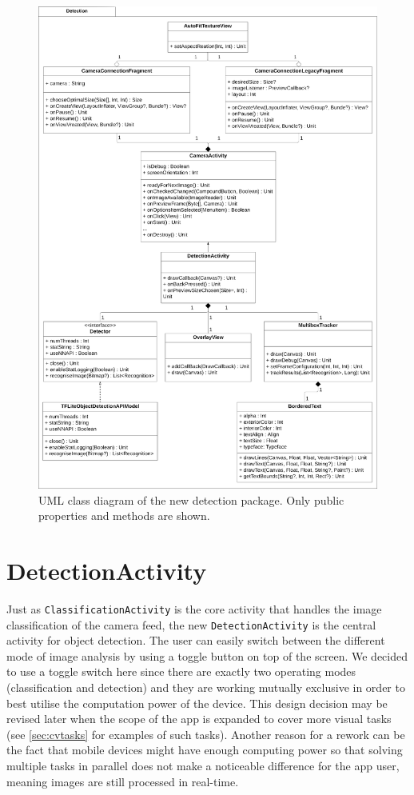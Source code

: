 \documentclass[
			   fontsize=11pt,
               paper=a4,
               bibliography=totoc,
               idxtotoc,
               headsepline,
               footsepline,
               footinclude=false,
               BCOR=12mm,
               DIV=13,
               openany,   %
               ]
               {scrbook}
\newcommand{\code}[1]{\lstinline[basicstyle = \ttfamily\small]{#1}} %
\begin{document}
\begin{figure}[H] %
	\centering
	\includegraphics[width=\textwidth]{figures/uml_detection_package.png}
	\caption[UML Class Diagram of The New Detection Package]{UML class diagram of the new detection package. Only public properties and methods are shown.}
	\label{fig:umlDetectionPackage} %
\end{figure}


\section{DetectionActivity}

Just as \code{ClassificationActivity} is the core activity that handles the image classification of the camera feed, the new \code{DetectionActivity} is the central activity for object detection. The user can easily switch between the different mode of image analysis by using a toggle button on top of the screen. We decided to use a toggle switch here since there are exactly two operating modes (classification and detection) and they are working mutually exclusive in order to best utilise the computation power of the device. This design decision may be revised later when the scope of the app is expanded to cover more visual tasks (see \autoref{sec:cvtasks} for examples of such tasks). Another reason for a rework can be the fact that mobile devices might have enough computing power so that solving multiple tasks in parallel does not make a noticeable difference for the app user, meaning images are still processed in real-time.
\end{document}
